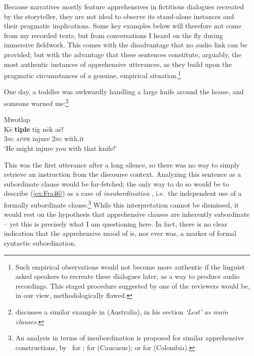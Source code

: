 \documentclass[output=paper,colorlinks,citecolor=brown]{langscibook}
\begin{document}
Because narratives mostly feature apprehensives in fictitious dialogues recreated by the storyteller, they are not ideal to observe its stand-alone instances and their pragmatic implications. Some key examples below will therefore not come from my recorded texts, but from conversations I heard on the fly during immersive fieldwork. This comes with the disadvantage that no audio link can be provided; but with the advantage that these sentences constitute, arguably, the most authentic instances of apprehensive utterances, as they build upon the pragmatic circumstances of a genuine, empirical situation.\footnote{Such empirical observations would not become more authentic if the linguist asked speakers to recreate these dialogues later, as a way to produce audio recordings. This staged procedure suggested by one of the reviewers would be, in our view, methodologically flawed.}

One day, a toddler was awkwardly handling a large knife around the house, and someone warned me:\footnote{\citet[229]{Austin1981} discusses a similar example in  (Australia), in his section \textit{`Lest' as main clauses}.}


\ea \label{ex:Fra46} \textnormal{Mwotlap} \francoissource{{[Mtp.AF-BP4-07b]}} \\
\gll Kē \textbf{tiple} tig nēk aē! \\
\textsc{3sg} \textsc{appr} injure \textsc{2sg} with.it \\
\glt `He might injure you with that knife!' \\
\z


\noindent This was the first utterance after a long silence, so there was no way to simply retrieve an instruction from the discourse context. Analyzing this sentence as a subordinate clause would be far-fetched; the only way to do so would be to describe (\ref{ex:Fra46}) as a case of \textit{insubordination} \citep{evans_insubordination_2007}, i.e.\ the independent use of a formally subordinate clause.\footnote{An analysis in terms of insubordination is proposed for similar apprehensive constructions, by~\citet{smithdennis2021} for ; \citet{chapters/daniel} for  (Caucasus); or \citet{chapters/dabkowski-anderbois} for  (Colombia).} While this interpretation cannot be dismissed, it would rest on the hypothesis that apprehensive clauses are inherently subordinate -- yet this is precisely what I am questioning here. In fact, there is no clear indication that the apprehensive mood of  is, nor ever was, a marker of formal syntactic subordination.
\end{document}
